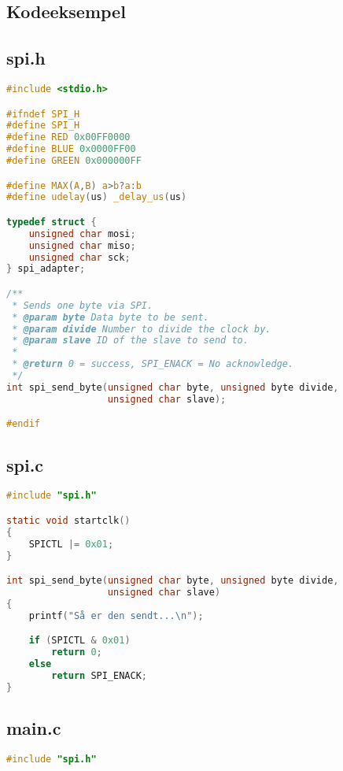 \documentclass[article, 10pt]{memoir}
\begin{document}
\clearpage
\begin{landscape}
\begin{multicols}{2}
\chapter{Kodeeksempel}
\section{spi.h}

\begin{lstlisting}[language=c]
#include <stdio.h>

#ifndef SPI_H
#define SPI_H
#define RED 0x00FF0000
#define BLUE 0x0000FF00
#define GREEN 0x000000FF

#define MAX(A,B) a>b?a:b
#define udelay(us) _delay_us(us)

typedef struct {
    unsigned char mosi;
    unsigned char miso;
    unsigned char sck;
} spi_adapter;

/**
 * Sends one byte via SPI.
 * @param byte Data byte to be sent.
 * @param divide Number to divide the clock by.
 * @param slave ID of the slave to send to.
 *
 * @return 0 = success, SPI_ENACK = No acknowledge.
 */
int spi_send_byte(unsigned char byte, unsigned byte divide,
                  unsigned char slave);

#endif
\end{lstlisting}

\vfill
\columnbreak
\section{spi.c}
\begin{lstlisting}[language=c]
#include "spi.h"

static void startclk()
{
    SPICTL |= 0x01;
}

int spi_send_byte(unsigned char byte, unsigned byte divide,
                  unsigned char slave)
{
    printf("Så er den sendt...\n");

    if (SPICTL & 0x01)
        return 0;
    else
        return SPI_ENACK;
}

\end{lstlisting}

\vfill
\columnbreak

\section{main.c}
\begin{lstlisting}[language=c]
#include "spi.h"


\end{lstlisting}
\end{multicols}
\end{landscape}
\end{document}

